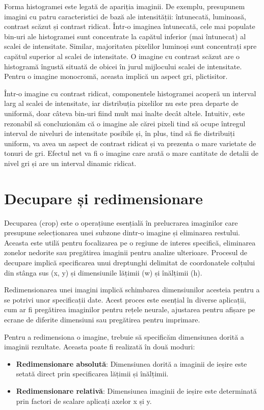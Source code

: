 \documentclass[a4paper,12pt]{report}
\begin{document}
Forma histogramei este legată de apariția imaginii. De exemplu, presupunem imagini cu patru caracteristici de bază ale intensității: întunecată, luminoasă, contrast scăzut și contrast ridicat. Într-o imaginea întunecată, cele mai populate bin-uri ale histogramei sunt concentrate la capătul inferior (mai întunecat) al scalei de intensitate. Similar, majoritatea pixelilor luminoși sunt concentrați spre capătul superior al scalei de intensitate. O imagine cu contrast scăzut are o histogramă îngustă situată de obicei în jurul mijlocului scalei de intensitate. Pentru o imagine monocromă, aceasta implică un aspect gri, plictisitor.

Într-o imagine cu contrast ridicat, componentele histogramei acoperă un interval larg al scalei de intensitate, iar distribuția pixelilor nu este prea departe de uniformă, doar câteva bin-uri fiind mult mai înalte decât altele. Intuitiv, este rezonabil să concluzionăm că o imagine ale cărei pixeli tind să ocupe întregul interval de niveluri de intensitate posibile și, în plus, tind să fie distribuiți uniform, va avea un aspect de contrast ridicat și va prezenta o mare varietate de tonuri de gri. Efectul net va fi o imagine care arată o mare cantitate de detalii de nivel gri și are un interval dinamic ridicat.

\section{Decupare și redimensionare}
Decuparea (crop) este o operațiune esențială în prelucrarea imaginilor care presupune selecționarea unei subzone dintr-o imagine și eliminarea restului. Aceasta este utilă pentru focalizarea pe o regiune de interes specifică, eliminarea zonelor nedorite sau pregătirea imaginii pentru analize ulterioare. Procesul de decupare implică specificarea unui dreptunghi delimitat de coordonatele colțului din stânga sus (x, y) și dimensiunile lățimii (w) și înălțimii (h).

Redimensionarea unei imagini implică schimbarea dimensiunilor acesteia pentru a se potrivi unor specificații date. Acest proces este esențial în diverse aplicații, cum ar fi pregătirea imaginilor pentru rețele neurale, ajustarea pentru afișare pe ecrane de diferite dimensiuni sau pregătirea pentru imprimare.

Pentru a redimensiona o imagine, trebuie să specificăm dimensiunea dorită a imaginii rezultate. Aceasta poate fi realizată în două moduri:
\begin{itemize}
    \item \textbf{Redimensionare absolută}: Dimensiunea dorită a imaginii de ieșire este setată direct prin specificarea lățimii și înălțimii.
    \item \textbf{Redimensionare relativă}: Dimensiunea imaginii de ieșire este determinată prin factori de scalare aplicați axelor x și y.
\end{itemize}
\end{document}
